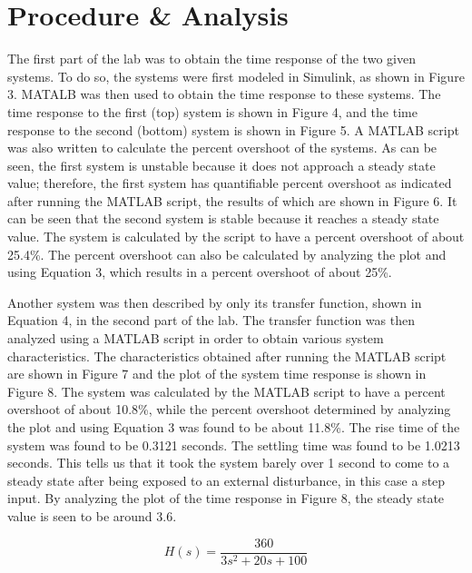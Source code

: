 \documentclass[12pt]{article}
\begin{document}
\section*{\fontsize{12}{12}\selectfont \large Procedure \& Analysis}
The first part of the lab was to obtain the time response of the two given systems. To do so, the systems were first modeled in Simulink, as shown in Figure 3. MATALB was then used to obtain the time response to these systems. The time response to the first (top) system is shown in Figure 4, and the time response to the second (bottom) system is shown in Figure 5. A MATLAB script was also written to calculate the percent overshoot of the systems. As can be seen, the first system is unstable because it does not approach a steady state value; therefore, the first system has quantifiable percent overshoot as indicated after running the MATLAB script, the results of which are shown in Figure 6. It can be seen that the second system is stable because it reaches  a steady state value. The system is calculated by the script to have a percent overshoot of about 25.4\%. The percent overshoot can also be calculated by analyzing the plot and using Equation 3, which results in a percent overshoot of about 25\%.
\bigskip

Another system was then described by only its transfer function, shown in Equation 4, in the second part of the lab. The transfer function was then analyzed using a MATLAB script in order to obtain various system characteristics. The characteristics obtained after running the MATLAB script are shown in Figure 7 and the plot of the system time response is shown in Figure 8. The system was calculated by the MATLAB script to have a percent overshoot of about 10.8\%, while the percent overshoot determined by analyzing the plot  and using Equation 3 was found to be about 11.8\%. The rise time of the system was found to be 0.3121 seconds. The settling time was found to be 1.0213 seconds. This tells us that it took the system barely over 1 second to come to a steady state after being exposed to an external disturbance, in this case a step input. By analyzing the plot of the time response in Figure 8, the steady state value is seen to be around 3.6.
\bigskip
\bigskip

\begin{equation}
H(s) = \frac{360}{3s^2+20s+100}
\end{equation}

\newpage
\end{document}
